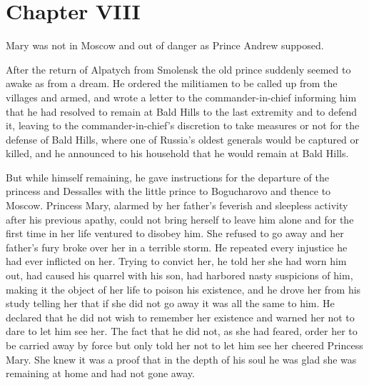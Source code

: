 
\chapter*{Chapter VIII} \ifaudio {}
\fi

 Mary was not in Moscow and out of danger as Prince
Andrew supposed.

After the return of Alpatych from Smolensk the old prince
suddenly seemed to awake as from a dream. He ordered the
militiamen to be called up from the villages and armed, and wrote
a letter to the commander-in-chief informing him that he had
resolved to remain at Bald Hills to the last extremity and to
defend it, leaving to the commander-in-chief's discretion to take
measures or not for the defense of Bald Hills, where one of
Russia's oldest generals would be captured or killed, and he
announced to his household that he would remain at Bald Hills.

But while himself remaining, he gave instructions for the
departure of the princess and Dessalles with the little prince to
Bogucharovo and thence to Moscow. Princess Mary, alarmed by her
father's feverish and sleepless activity after his previous
apathy, could not bring herself to leave him alone and for the
first time in her life ventured to disobey him. She refused to go
away and her father's fury broke over her in a terrible storm. He
repeated every injustice he had ever inflicted on her. Trying to
convict her, he told her she had worn him out, had caused his
quarrel with his son, had harbored nasty suspicions of him,
making it the object of her life to poison his existence, and he
drove her from his study telling her that if she did not go away
it was all the same to him. He declared that he did not wish to
remember her existence and warned her not to dare to let him see
her. The fact that he did not, as she had feared, order her to be
carried away by force but only told her not to let him see her
cheered Princess Mary. She knew it was a proof that in the depth
of his soul he was glad she was remaining at home and had not
gone away.

